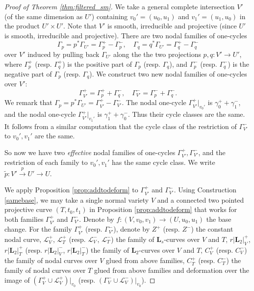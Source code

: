 \documentclass{amsart}
\theoremstyle{definition}
\theoremstyle{remark}
\begin{document}
\begin{proof}[Proof of Theorem \ref{thm:filtered_sm}]
    We take a general complete intersection $V'$ (of the same dimension as $U'$) containing $v_0'=(u_0, u_1)$ and $v_1'=(u_1, u_0)$ in the product $U' \times U'$.
    Note that $V'$ is smooth, irreducible and projective (since $U'$ is smooth, irreducible and projective).
    There are two nodal families of one-cycles $$\Gamma_p=p^*\Gamma_{U'}=\Gamma_p^+-\Gamma_p^-, \quad\Gamma_q=q^*\Gamma_{U'}=\Gamma_q^+-\Gamma_q^-$$ over $V'$ induced by pulling back $\Gamma_{U'}$ along the the two projections $p, q: V' \to U'$, where $\Gamma_p^+$ (resp. $\Gamma_q^+$) is the positive part of $\Gamma_p$ (resp. $\Gamma_q$), and $\Gamma_p^-$ (resp. $\Gamma_q^-$) is the negative part of $\Gamma_p$ (resp. $\Gamma_q$). 
    We construct two new nodal families of one-cycles over $V'$:
    \[
{\Gamma}_{V'}^+=\Gamma_p^++\Gamma_q^-,\quad \Gamma_{V'}^-=\Gamma_p^-+\Gamma_q^-.
    \]
    We remark that $\Gamma_p=p^*\Gamma_{U'}=\Gamma_{V'}^+-\Gamma_{V'}^-$.
    The nodal one-cycle $\Gamma_{V'}^+|_{v_0'}$ is $\gamma_0^++\gamma_1^-$, and the nodal one-cycle $\Gamma_{V'}^+|_{v_1'}$ is $\gamma_1^++\gamma_0^-$. 
    Thus their cycle classes are the same. 
    It follows from a similar computation that the cycle class of the restriction of $\Gamma_{V'}^-$ to $v_0', v_1'$ are the same.
    

    

    So now we have two \emph{effective} nodal families of one-cycles $\Gamma_{V'}^+, \Gamma_{V'}^-$, and the restriction of each family to $v_0', v_1'$ has the same cycle class.
    We write $\tilde{p}:V' \xrightarrow{p} U' \to U$.

    We apply Proposition \ref{prop:addtodeform} to $\Gamma_{V'}^+$ and $\Gamma_{V'}^-$.
    Using Construction \ref{samebase}, we may take a single normal variety $V$ and a connected two pointed projective curve $(T, t_0, t_1)$ in Proposition \ref{prop:addtodeform} that works for both families $\Gamma_{V'}^+$ and $\Gamma_{V'}^-$.
    Denote by $f: (V, v_0, v_1) \to (U, u_0, u_1)$ the base change. 
    For the family $\Gamma_{V'}^+$ (resp. $\Gamma_{V'}^-$), denote by $Z^+$ (resp. $Z^-$) the constant nodal curve, $\mathcal{L}_V^+$, $\mathcal{L}_T^+$ (resp. $\mathcal{L}_V^-$, $\mathcal{L}_T^-$) the family of $\mathbf{L}_s$-curves over $V$ and $T$, $r|\mathbf{L}_2|_V^+$,  $r|\mathbf{L}_2|_T^+$ (resp. $r|\mathbf{L}_2|_V^-$, $r|\mathbf{L}_2|_T^-$) the family of $\mathbf{L}_2$-curves over $V$ and $T$, $C_V^+$ (resp. $C_V^-$) the family of nodal curves  over $V$ glued from above families, $C_T^+$ (resp. $C_T^-$) the family of nodal curves over $T$ glued from above families and deformation over the image of $(\Gamma_{V}^+\cup \mathcal{L}_V^+)|_{v_0}$ (resp. $(\Gamma_{V}^-\cup \mathcal{L}_V^-)|_{v_0}$).


\end{proof}
\end{document}
